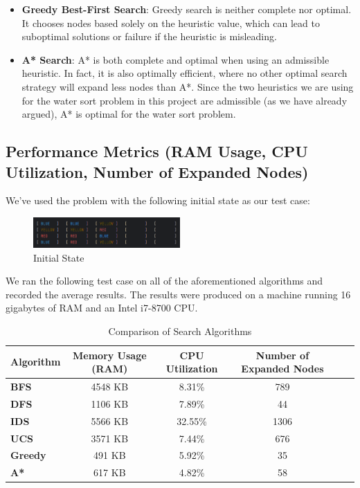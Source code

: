 \documentclass{article}
\begin{document}
\begin{itemize}
    \item \textbf{Greedy Best-First Search}: Greedy search is neither complete nor optimal. It chooses nodes based solely on the heuristic value, which can lead to suboptimal solutions or failure if the heuristic is misleading.

    \item \textbf{A* Search}: A* is both complete and optimal when using an admissible heuristic. In fact, it is also optimally efficient, where no other optimal search strategy will expand less nodes than A*. Since the two heuristics we are using for the water sort problem in this project are admissible (as we have already argued), A* is optimal for the water sort problem.
\end{itemize}

\subsection{Performance Metrics (RAM Usage, CPU Utilization, Number of Expanded Nodes)}

We've used the problem with the following initial state as our test case:
\begin{figure}[ht]
    \centering
    \includegraphics[width=0.5\textwidth]{TestCase1.png}
    \caption{Initial State}
    \label{fig:testcase1}
\end{figure}

We ran the following test case on all of the aforementioned algorithms and recorded the average results. The results were produced on a machine running 16 gigabytes of RAM and an Intel i7-8700 CPU.

\begin{table}[H]
    \centering
    \begin{tabular}{|l|c|c|c|c|c|}
        \hline
        \textbf{Algorithm} & \textbf{Memory Usage (RAM)} & \textbf{CPU Utilization} & \textbf{Number of Expanded Nodes} \\ \hline
        \textbf{BFS} & 4548 KB & 8.31\% & 789 \\ \hline
        \textbf{DFS} & 1106 KB & 7.89\% & 44 \\ \hline
        \textbf{IDS} & 5566 KB & 32.55\% & 1306 \\ \hline
        \textbf{UCS} & 3571 KB & 7.44\% & 676 \\ \hline
        \textbf{Greedy} & 491 KB & 5.92\% & 35 \\ \hline
        \textbf{A*} & 617 KB & 4.82\% & 58 \\ \hline
    \end{tabular}
    \caption{Comparison of Search Algorithms}
\end{table}
\end{document}
